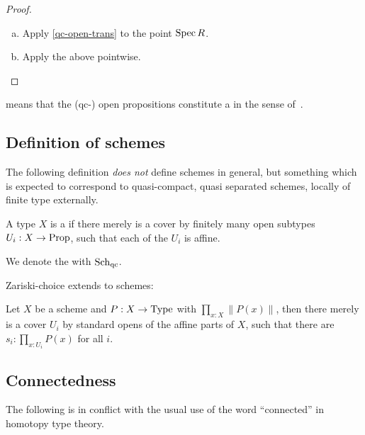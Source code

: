 \begin{proof}
  \begin{enumerate}[(a)]
  \item Apply \cref{qc-open-trans} to the point $\operatorname{Spec} R$.
  \item Apply the above pointwise.
  \end{enumerate}
\end{proof}

\begin{remark}
   means that
  the (qc-) open propositions constitute a 
  in the sense of~\cite{rosolini-phd-thesis}.
\end{remark}

\subsection{Definition of schemes}

The following definition \emph{does not} define schemes in general,
but something which is expected to correspond to quasi-compact, quasi separated schemes,
locally of finite type externally.

\begin{definition}%
  \label{schemes}
  A type $X$ is a 
  if there merely is a cover by finitely many open subtypes $U_i:X\to\mathrm{Prop}$,
  such that each of the $U_i$ is affine.
\end{definition}

\begin{definition}
  \label{type-of-schemes}
  We denote the  with $\Sch$\index{$\Sch$}.
\end{definition}

Zariski-choice  extends to schemes:

\begin{proposition}%
  Let $X$ be a scheme and $P:X\to \mathrm{Type}$ with $\prod_{x:X}\|P(x)\|$,
  then there merely is a cover $U_i$ by standard opens of the affine parts of $X$,
  such that there are $s_i:\prod_{x:U_i}P(x)$ for all $i$.
\end{proposition}

\subsection{Connectedness}
The following is in conflict with the usual use of the word ``connected'' in homotopy type theory.

